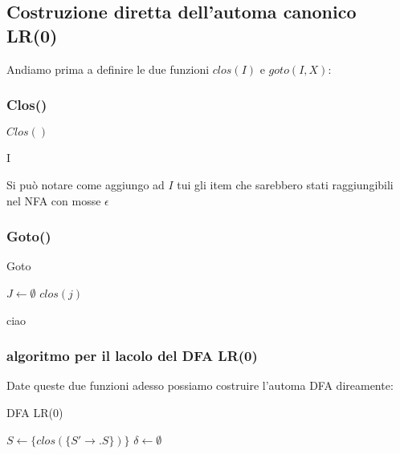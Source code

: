 \subsection{Costruzione diretta dell’automa canonico LR(0)}
Andiamo prima a definire le due funzioni $clos(I)$ e $goto(I,X)$:

\subsubsection{Clos()}
\begin{algorithm}
    \caption{$Clos()$}

    \Return I\;
\end{algorithm}

Si può notare come aggiungo ad $I$  tui gli item che sarebbero stati raggiungibili nel NFA con mosse $\epsilon$
\subsubsection{Goto()}

\begin{algorithm}
    \caption{Goto}

    $J \gets \emptyset$\;
    \Return $clos(j)$ 
\end{algorithm}

ciao


\subsubsection{algoritmo per il lacolo del DFA LR(0)}
Date queste due funzioni adesso possiamo costruire l’automa DFA direamente:

\begin{algorithm}
    \caption{DFA LR(0)}
    $S \gets \{clos(\{S' \to .S\})\}$\;
    $\delta\gets \emptyset$\;
\end{algorithm}

